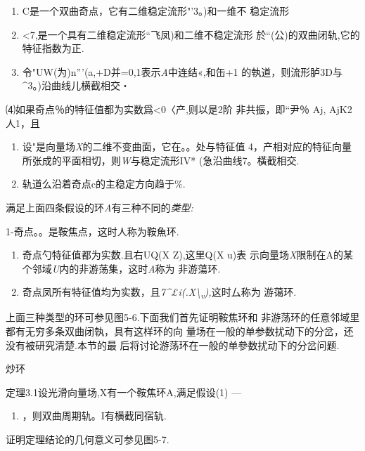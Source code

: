\documentclass{article}
\begin{document}
\begin{enumerate}
\def\labelenumi{(\arabic{enumi})}
\item
  C是一个双曲奇点，它有二维稳定流形"'3。)和一维不 稳定流形
\item
  \textless{}7,是一个具有二维稳定流形``飞凤)和二维不稳定流形
  於``(公)的双曲闭轨,它的特征指数为正.
\item
  令"UW(为)n'''(a,+D并=0,1表示\emph{A}中连结«,和缶+1
  的執道，则流形胪3D与\^{}3。)沿曲线儿横截相交・
\end{enumerate}

⑷如果奇点％的特征值都为实数爲\textless{}0〈产,则以是2阶 非共振，即``尹％
Aj, AjK2人1，且

\begin{enumerate}
\def\labelenumi{(\alph{enumi})}
\item
  设"是向量场\emph{X}的二维不变曲面，它在。。处与特征值
  4，产相对应的特征向量所张成的平面相切，则\emph{W}与稳定流形IV*
  (急沿曲线7。橫截相交.
\item
  轨道么沿着奇点c的主稳定方向趋于\%.
\end{enumerate}

满足上面四条假设的环\emph{A}有三种不同的\emph{类型:}

1-奇点。。是鞍焦点，这时人称为鞍魚环.

\begin{enumerate}
\def\labelenumi{\arabic{enumi}.}
\setcounter{enumi}{1}
\item
  奇点勺特征值都为实数.且右UQ(X Z),这里Q(X \textbar{}u)表
  示向量场\emph{X}限制在A的某个邻域\emph{U}内的非游荡集，这时\emph{A}称为
  非游蕩环.
\item
  奇点凤所有特征值均为实数，且\emph{7\^{}£i(.X\textbackslash{}\textsubscript{v}),}这时厶称为
  游蔼环.
\end{enumerate}

上面三种类型的环可参见图5-6.下面我们首先证明鞍焦环和
非游荡环的任意邻域里都有无穷多条双曲闭執，具有这样环的向
量场在一般的单参数扰动下的分岔，还没有被研究清楚.本节的最
后将讨论游荡环在一般的单參数扰动下的分岔问题.

炒环

定理3.1设光滑向量场,X有一个鞍焦环A,满足假设(1) ---

\begin{enumerate}
\def\labelenumi{(\arabic{enumi})}
\setcounter{enumi}{2}
\item
  ，则双曲周期轨。I有横截同宿轨.
\end{enumerate}

证明定理结论的几何意义可参见图5-7.
\end{document}
